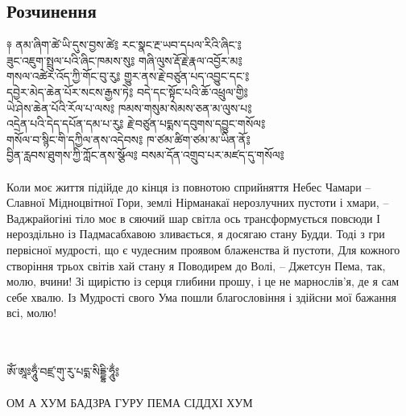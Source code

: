 \newpage
\subsection{Розчинення}
\vspace{0.5cm}
\ti
༈ ནམ་ཞིག་ཚེ་ཡི་དུས་བྱས་ཚེ༔ རང་སྣང་རྔ་ཡབ་དཔལ་རིའི་ཞིང་༔\\
ཟུང་འཇུག་སྤྲུལ་པའི་ཞིང་ཁམས་སུ༔ གཞི་ལུས་རྡོ་རྗེ་རྣལ་འབྱོར་མ༔\\
གསལ་འཚེར་འོད་ཀྱི་གོང་བུ་རུ༔ གྱུར་ནས་རྗེ་བཙུན་པད་འབྱུང་དང་༔\\
དབྱེར་མེད་ཆེན་པོར་སངས་རྒྱས་ཏེ༔ བདེ་དང་སྟོང་པའི་ཆོ་འཕྲུལ་གྱི༔\\
ཡེ་ཤེས་ཆེན་པོའི་རོལ་པ་ལས༔ ཁམས་གསུམ་སེམས་ཅན་མ་ལུས་པ༔\\
འདྲེན་པའི་དེད་དཔོན་དམ་པ་རུ༔ རྗེ་བཙུན་པདྨས་དབུགས་དབྱུང་གསོལ༔\\
གསོལ་བ་སྙིང་གི་དཀྱིལ་ནས་འདེབས༔ ཁ་ཙམ་ཚིག་ཙམ་མ་ཡིན་ནོ༔\\
བྱིན་རླབས་ཐུགས་ཀྱི་ཀློང་ནས་སྩོལ༔ བསམ་དོན་འགྲུབ་པར་མཛད་དུ་གསོལ༔\\
\\
\ru
Коли моє життя підійде до кінця із повнотою сприйняття Небес Чамари --
Славної Мідноцвітної Гори, землі Нірманакаї нерозлучних пустоти і хмари, --
Ваджрайогіні тіло моє в сяючий шар світла ось трансформується повсюди
І нероздільно із Падмасабхавою зливається, я досягаю стану Будди.
Тоді з гри первісної мудрості, що є чудесним проявом блаженства й пустоти,
Для кожного створіння трьох світів хай стану я Поводирем до Волі, -- Джетсун Пема, так, молю, вчини!
Зі щирістю із серця глибини прошу, і це не марнослів'я, де я сам себе хвалю.
Із Мудрості свого Ума пошли благословіння і здійсни мої бажання всі, молю!

\\
\vspace{0.5cm}
\\
\ti ཨོཾ་ཨཱཿཧཱུྂ་བཛྲ་གུ་རུ་པདྨ་སིདྡྷི་ཧཱུྂ༔\\
\\
\ru ОМ А ХУМ БАДЗРА ГУРУ ПЕМА СІДДХІ ХУМ\\

